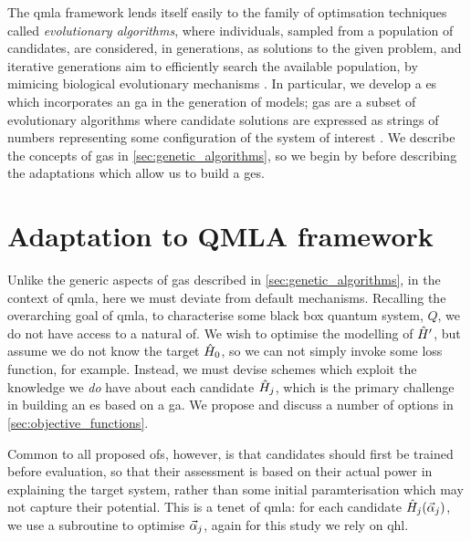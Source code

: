 The \gls{qmla} framework lends itself easily to the family of optimsation techniques called \emph{evolutionary algorithms}, 
    where individuals, sampled from a population of candidates, are considered, in generations, as solutions to the given problem,
    and iterative generations aim to efficiently search the available population, 
    by mimicing biological evolutionary mechanisms \cite{back1996evolutionary}. 
In particular, we develop a \gls{es} which incorporates an \gls{ga} in the generation of models;
    \glspl{ga} are a subset of evolutionary algorithms where candidate solutions are expressed as 
    strings of numbers representing some configuration of the system of interest \cite{holland1992adaptation}.
We describe the concepts of \glspl{ga} in \cref{sec:genetic_algorithms}, 
    so we begin by before describing the adaptations which allow us to build a \gls{ges}. 
\par 

\section{Adaptation to QMLA framework}\label{sec:ga_adaptation_to_qmla}
Unlike the generic aspects of \glspl{ga} described in \cref{sec:genetic_algorithms}, 
    in the context of \gls{qmla}, here we must deviate from default mechanisms. 
Recalling the overarching goal of \gls{qmla}, to characterise some black box quantum system, 
    $Q$, we do not have access to a natural \gls{of}.
We wish to optimise the modelling of $\hat{H}^{\prime}$, but assume we do not know the target $\hat{H}_0$, 
    so we can not simply invoke some loss function, for example. 
Instead, we must devise schemes which exploit the knowledge we \emph{do} have about each candidate $\hat{H}_j$, 
    which is the primary challenge in building an \gls{es} based on a \gls{ga}.  
We propose and discuss a number of options in \cref{sec:objective_functions}. 
\par 

Common to all proposed \glspl{of}, however, is that candidates should first be trained before evaluation, 
    so that their assessment is based on their actual power in explaining the target system, 
    rather than some initial paramterisation which may not capture their potential. 
This is a tenet of \gls{qmla}: for each candidate $\hat{H}_j ( \vec{\alpha}_j )$, we use a subroutine to optimise $\vec{\alpha}_j$, 
    again for this study we rely on \gls{qhl}. 

